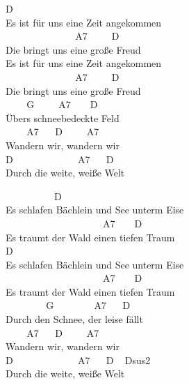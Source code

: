 \documentclass[
  letterpaper,
  twoside=false]{scrbook}
\begin{document}
D\\
Es ist für uns eine Zeit angekommen\\
\hspace*{0.333em} ~ ~ ~ ~ ~ ~ ~ ~ ~A7 ~ ~ ~D\\
Die bringt uns eine große Freud\\
Es ist für uns eine Zeit angekommen\\
\hspace*{0.333em} ~ ~ ~ ~ ~ ~ ~ ~ ~A7 ~ ~ ~D\\
Die bringt uns eine große Freud\\
\hspace*{0.333em} ~ ~ ~G ~ ~ ~A7 ~ ~ D\\
Übers schneebedeckte Feld\\
\hspace*{0.333em} ~ ~ ~A7 ~ ~D ~ ~ ~A7\\
Wandern wir, wandern wir\\
D ~ ~ ~ ~ ~ ~ ~ ~A7 ~ ~D\\
Durch die weite, weiße Welt

~ ~ ~ ~ ~ ~ D\\
Es schlafen Bächlein und See unterm Eise\\
\hspace*{0.333em} ~ ~ ~ ~ ~ ~ ~ ~ ~ ~ ~ ~ A7 ~ ~ D\\
Es traumt der Wald einen tiefen Traum\\
D\\
Es schlafen Bächlein und See unterm Eise\\
\hspace*{0.333em} ~ ~ ~ ~ ~ ~ ~ ~ ~ ~ ~ ~ A7 ~ ~ D\\
Es traumt der Wald einen tiefen Traum\\
\hspace*{0.333em} ~ ~ ~ ~ ~ G ~ ~ ~ ~ ~A7 ~ ~D\\
Durch den Schnee, der leise fällt\\
\hspace*{0.333em} ~ ~ ~A7 ~ ~D ~ ~ ~A7\\
Wandern wir, wandern wir\\
D ~ ~ ~ ~ ~ ~ ~ ~A7 ~ ~D ~ Dsus2\\
Durch die weite, weiße Welt
\end{document}
